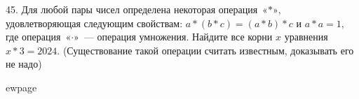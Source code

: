 45. Для любой пары чисел определена некоторая операция $\text{«$\ast$»,}$ удовлетворяющая следующим свойствам:
$a*(b*c)=(a*b)*c$ и $a*a=1,$ где операция $\text{«$\cdot$»}$ --- операция умножения. Найдите все корни $x$ уравнения
$x*3=2024.$ (Существование такой операции считать известным, доказывать его не надо)

ewpage
